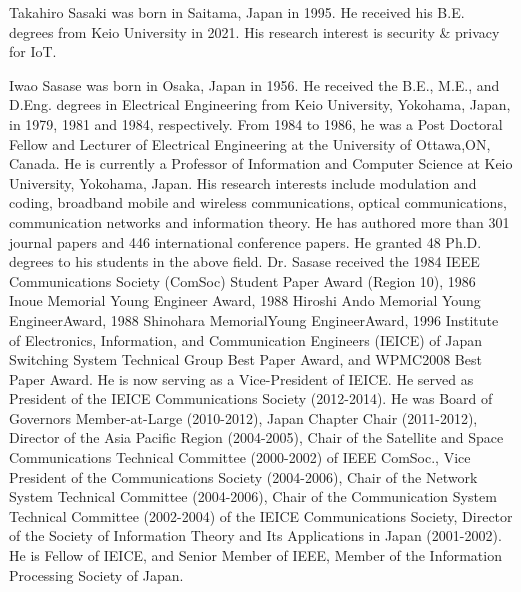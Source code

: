 \documentclass{ieeeaccess}
\begin{document}
\begin{IEEEbiography}{Takahiro Sasaki} was born in Saitama, Japan in 1995. He received his B.E. degrees from Keio University in 2021. His research interest is security \& privacy for IoT.
\end{IEEEbiography}

\begin{IEEEbiography}{Iwao Sasase} was born in Osaka, Japan in 1956. He received the B.E., M.E., and D.Eng. degrees in Electrical Engineering from Keio University, Yokohama, Japan, in 1979, 1981 and 1984, respectively. From 1984 to 1986, he was a Post Doctoral Fellow and Lecturer of Electrical Engineering at the University of Ottawa,ON, Canada. He is currently a Professor of Information and Computer Science at Keio University, Yokohama, Japan. His research interests include modulation and coding, broadband mobile and  wireless communications, optical communications, communication networks and information theory. He has authored more than 301 journal papers and 446 international conference papers. He granted 48 Ph.D. degrees to his students in the above field. Dr. Sasase received the 1984 IEEE Communications Society (ComSoc) Student Paper Award (Region 10), 1986 Inoue Memorial Young Engineer Award, 1988 Hiroshi Ando Memorial Young EngineerAward, 1988 Shinohara MemorialYoung EngineerAward, 1996 Institute of Electronics, Information, and Communication Engineers (IEICE) of Japan Switching System Technical Group Best Paper Award, and WPMC2008 Best Paper Award. He is now serving as a Vice-President of IEICE. He served as President of the IEICE Communications Society (2012-2014). He was Board of Governors Member-at-Large (2010-2012), Japan Chapter Chair (2011-2012), Director of the Asia Pacific Region (2004-2005), Chair of the Satellite and Space Communications Technical Committee (2000-2002) of IEEE ComSoc., Vice President of the Communications Society (2004-2006), Chair of the Network System Technical Committee (2004-2006), Chair of the Communication System Technical Committee (2002-2004) of the IEICE Communications Society, Director of the Society of Information Theory and Its Applications in Japan (2001-2002). He is Fellow of IEICE, and Senior Member of IEEE, Member of the Information Processing Society of Japan.
\end{IEEEbiography}

\endgroup
\EOD
\end{document}
